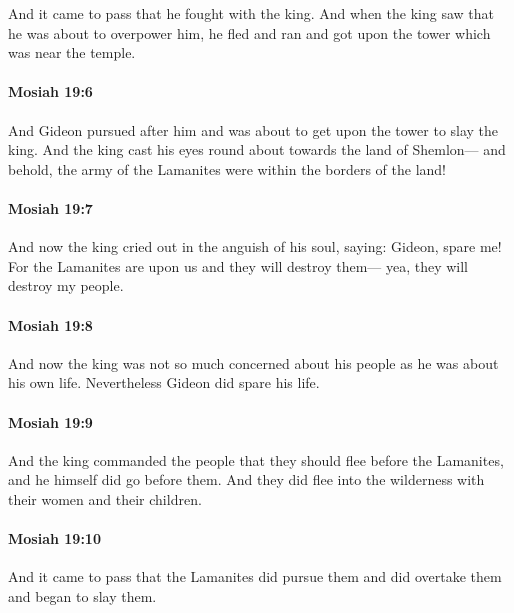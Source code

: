 			And it came to pass that he fought with the king.
			And when the king saw that he was about to overpower him,
			he fled and ran and got upon the tower which was near the temple.

		\paragraph{Mosiah 19:6} %
			\label{MOSIAH-19-6}

			And Gideon pursued after him
			and was about to get upon the tower to slay the king.
			And the king cast his eyes round about towards the land of Shemlon---
			and behold, the army of the Lamanites were within the borders of the land!

		\paragraph{Mosiah 19:7} %
			\label{MOSIAH-19-7}

			And now the king cried out in the anguish of his soul, saying:
			Gideon, spare me!
			For the Lamanites are upon us and they will destroy them---
			yea, they will destroy my people.

		\paragraph{Mosiah 19:8} %
			\label{MOSIAH-19-8}

			And now the king was not so much concerned about his people
			as he was about his own life.
			Nevertheless Gideon did spare his life.

		\paragraph{Mosiah 19:9} %
			\label{MOSIAH-19-9}

			And the king commanded the people
			that they should flee before the Lamanites,
			and he himself did go before them.
			And they did flee into the wilderness with their women and their children.

		\paragraph{Mosiah 19:10} %
			\label{MOSIAH-19-10}

			And it came to pass that the Lamanites did pursue them
			and did overtake them and began to slay them.

